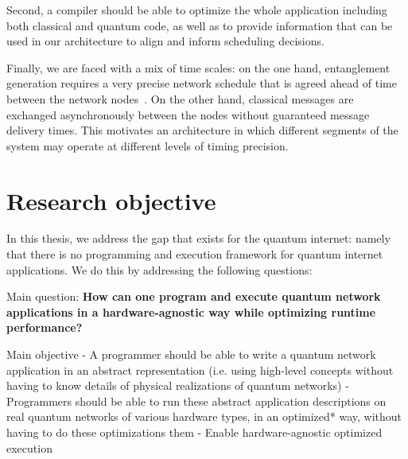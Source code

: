 Second, a compiler should be able to optimize the whole application including both classical and quantum code, as well as to provide information that can be used in our architecture to align and inform scheduling decisions. 

Finally, we are faced with a mix of time scales:
on the one hand, entanglement generation requires a very precise network schedule that is agreed ahead of time between the network nodes~\cite{dahlberg2019link}. On the other hand, classical messages are exchanged asynchronously between the nodes without guaranteed message delivery times. This motivates an architecture in which different segments of the system may operate at different levels of timing precision. 


\section{Research objective}
In this thesis, we address the gap that exists for the quantum internet: namely that there is no programming and execution framework for quantum internet applications.
We do this by addressing the following questions:

Main question: \textbf{How can one program and execute quantum network applications in a hardware-agnostic way while optimizing runtime performance?}


Main objective
- A programmer should be able to write a quantum network application in an abstract representation (i.e. using high-level concepts without having to know details of physical realizations of quantum networks)
- Programmers should be able to run these abstract application descriptions on real quantum networks of various hardware types, in an optimized* way, without having to do these optimizations them
- Enable hardware-agnostic optimized execution


